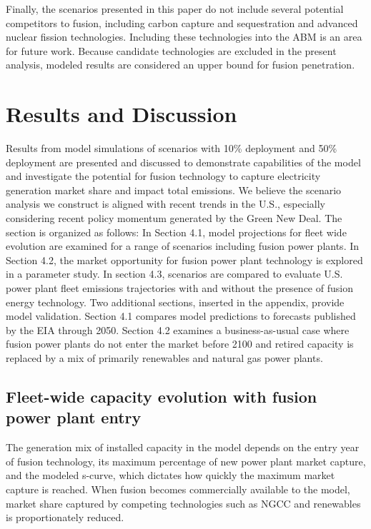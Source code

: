\documentclass[review]{elsarticle}
\begin{document}
Finally, the scenarios presented in this paper do not include several potential competitors to fusion, including carbon capture and sequestration and advanced nuclear fission technologies. Including these technologies into the ABM is an area for future work. Because candidate technologies are excluded in the present analysis, modeled results are considered an upper bound for fusion penetration.

\section{Results and Discussion}

Results from model simulations of scenarios with 10\% deployment and 50\% deployment are presented and discussed to demonstrate capabilities of the model and investigate the potential for fusion technology to capture electricity generation market share and impact total emissions.  We believe the scenario analysis we construct is aligned with recent trends in the U.S., especially considering recent policy momentum generated by the Green New Deal.  The section is organized as follows: In Section 4.1, model projections for fleet wide evolution are examined for a range of scenarios including fusion power plants. In Section 4.2, the market opportunity for fusion power plant technology is explored in a parameter study. In section 4.3, scenarios are compared to evaluate U.S. power plant fleet emissions trajectories with and without the presence of fusion energy technology. Two additional sections, inserted in the appendix, provide model validation. Section 4.1 compares model predictions to forecasts published by the EIA through 2050. Section 4.2 examines a business-as-usual case where fusion power plants do not enter the market before 2100 and retired capacity is replaced by a mix of primarily renewables and natural gas power plants. 

\subsection{Fleet-wide capacity evolution with fusion power plant entry}

The generation mix of installed capacity in the model depends on the entry year of fusion technology, its maximum percentage of new power plant market capture, and the modeled s-curve, which dictates how quickly the maximum market capture is reached. When fusion becomes commercially available to the model, market share captured by competing technologies such as NGCC and renewables is proportionately reduced.
\end{document}

